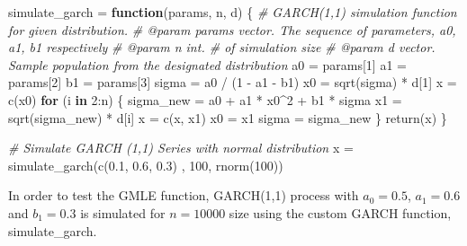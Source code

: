 \documentclass[
  11pt,
]{article}
\newenvironment{Shaded}{\begin{snugshade}}{\end{snugshade}}
\newcommand{\CommentTok}[1]{\textcolor[rgb]{0.56,0.35,0.01}{\textit{#1}}}
\newcommand{\ControlFlowTok}[1]{\textcolor[rgb]{0.13,0.29,0.53}{\textbf{#1}}}
\newcommand{\DecValTok}[1]{\textcolor[rgb]{0.00,0.00,0.81}{#1}}
\newcommand{\FloatTok}[1]{\textcolor[rgb]{0.00,0.00,0.81}{#1}}
\newcommand{\FunctionTok}[1]{\textcolor[rgb]{0.00,0.00,0.00}{#1}}
\newcommand{\NormalTok}[1]{#1}
\newcommand{\OtherTok}[1]{\textcolor[rgb]{0.56,0.35,0.01}{#1}}
\newcommand{\SpecialCharTok}[1]{\textcolor[rgb]{0.00,0.00,0.00}{#1}}
\begin{document}
\begin{Shaded}
\begin{Highlighting}[]
\NormalTok{simulate\_garch }\OtherTok{=} \ControlFlowTok{function}\NormalTok{(params, n, d)  \{}
  \CommentTok{\#\textquotesingle{} GARCH(1,1) simulation function for given distribution.}
  \CommentTok{\#\textquotesingle{} @param params vector. The sequence of parameters, a0, a1, b1 respectively}
  \CommentTok{\#\textquotesingle{} @param n int. \# of simulation size}
  \CommentTok{\#\textquotesingle{} @param d vector. Sample population from the designated distribution}
\NormalTok{  a0 }\OtherTok{=}\NormalTok{ params[}\DecValTok{1}\NormalTok{]}
\NormalTok{  a1 }\OtherTok{=}\NormalTok{ params[}\DecValTok{2}\NormalTok{]}
\NormalTok{  b1 }\OtherTok{=}\NormalTok{ params[}\DecValTok{3}\NormalTok{]}
\NormalTok{  sigma }\OtherTok{=}\NormalTok{ a0 }\SpecialCharTok{/}\NormalTok{ (}\DecValTok{1} \SpecialCharTok{{-}}\NormalTok{ a1 }\SpecialCharTok{{-}}\NormalTok{ b1)}
\NormalTok{  x0 }\OtherTok{=} \FunctionTok{sqrt}\NormalTok{(sigma) }\SpecialCharTok{*}\NormalTok{ d[}\DecValTok{1}\NormalTok{]}
\NormalTok{  x }\OtherTok{=} \FunctionTok{c}\NormalTok{(x0)}
  \ControlFlowTok{for}\NormalTok{ (i }\ControlFlowTok{in} \DecValTok{2}\SpecialCharTok{:}\NormalTok{n) \{}
\NormalTok{    sigma\_new }\OtherTok{=}\NormalTok{ a0 }\SpecialCharTok{+}\NormalTok{ a1 }\SpecialCharTok{*}\NormalTok{ x0}\SpecialCharTok{\^{}}\DecValTok{2} \SpecialCharTok{+}\NormalTok{ b1 }\SpecialCharTok{*}\NormalTok{ sigma}
\NormalTok{    x1 }\OtherTok{=} \FunctionTok{sqrt}\NormalTok{(sigma\_new) }\SpecialCharTok{*}\NormalTok{ d[i]}
\NormalTok{    x }\OtherTok{=} \FunctionTok{c}\NormalTok{(x, x1)}
\NormalTok{    x0 }\OtherTok{=}\NormalTok{ x1}
\NormalTok{    sigma }\OtherTok{=}\NormalTok{ sigma\_new}
\NormalTok{  \}}
  \FunctionTok{return}\NormalTok{(x)}
\NormalTok{\}}

\CommentTok{\# Simulate GARCH (1,1) Series with normal distribution}
\NormalTok{x }\OtherTok{=} \FunctionTok{simulate\_garch}\NormalTok{(}\FunctionTok{c}\NormalTok{(}\FloatTok{0.1}\NormalTok{, }\FloatTok{0.6}\NormalTok{, }\FloatTok{0.3}\NormalTok{) , }\DecValTok{100}\NormalTok{, }\FunctionTok{rnorm}\NormalTok{(}\DecValTok{100}\NormalTok{))}
\end{Highlighting}
\end{Shaded}

In order to test the GMLE function, GARCH(1,1) process with \(a_0=0.5\),
\(a_1=0.6\) and \(b_1=0.3\) is simulated for \(n=10000\) size using the
custom GARCH function, simulate\_garch.
\end{document}
